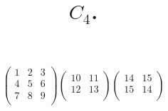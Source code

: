 \documentclass[12pt,a4paper]{amsart}
\title{$C_4$.}
\begin{document}
\maketitle

\begin{align*}
  \left(
  \begin{array}{ccc}
    1&2&3\\
    4&5&6\\
    7&8&9\\
  \end{array}
\right)
  \left(
  \begin{array}{cc}
    10&11\\
    12&13\\
  \end{array}
\right)
  \left(
  \begin{array}{cc}
    14&15\\
    15&14\\
  \end{array}
\right)
\end{align*}
\end{document}
